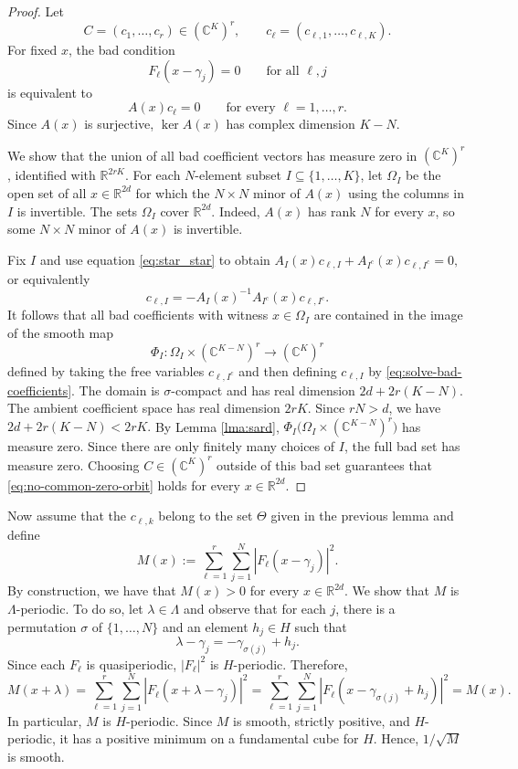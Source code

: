 \documentclass[reqno,a4paper,12pt]{amsart}
\numberwithin{equation}{section}
\newcommand\1{\mathds{1}}
\begin{document}
\begin{proof}
Let
$$
C=(c_1,\dots,c_r)\in(\mathbb C^K)^r,
\qquad
c_\ell=(c_{\ell,1},\dots,c_{\ell,K}).
$$
For fixed $x$, the bad condition
$$
F_\ell(x-\gamma_j)=0
\qquad
\text{for all } \ell,j
$$
is equivalent to
$$
A(x)c_\ell=0
\qquad
\text{for every } \ell=1,\dots,r.
$$
Since $A(x)$ is surjective, $\ker A(x)$ has complex dimension $K-N$.

We show that the union of all bad coefficient vectors has measure zero in
$(\mathbb C^K)^r$, identified with $\mathbb R^{2rK}$. For each
$N$-element subset $I\subseteq\{1,\dots,K\}$, let $\Omega_I$ be the open
set of all $x\in\mathbb R^{2d}$ for which the $N\times N$ minor of
$A(x)$ using the columns in $I$ is invertible. The sets $\Omega_I$ cover
$\mathbb R^{2d}$.
Indeed, $A(x)$ has rank $N$ for every $x$, so some $N\times N$
minor of $A(x)$ is invertible.

Fix $I$ and use equation \eqref{eq:star_star} to obtain
$
A_I(x)c_{\ell,I}+A_{I^c}(x)c_{\ell,I^c}=0,
$
or equivalently
\begin{equation}\label{eq:solve-bad-coefficients}
    c_{\ell,I}
=
-A_I(x)^{-1}A_{I^c}(x)c_{\ell,I^c}.
\end{equation}
It follows that all bad coefficients with witness $x\in\Omega_I$ are contained in the
image of the smooth map
$$
\Phi_I:
\Omega_I\times(\mathbb C^{K-N})^r
\to
(\mathbb C^K)^r
$$
defined by taking the free variables $c_{\ell,I^c}$ and then defining
$c_{\ell,I}$ by \eqref{eq:solve-bad-coefficients}. The domain is
$\sigma$-compact and has real dimension
$
2d+2r(K-N).
$
The ambient coefficient space has real dimension
$
2rK.
$
Since $rN>d$, we have
$
2d+2r(K-N)<2rK.
$
By Lemma \ref{lma:sard}, $\Phi_I\bigl(\Omega_I\times(\mathbb C^{K-N})^r\bigr)$
has measure zero. Since there are only finitely many choices of $I$,  the full
bad set has measure zero.
Choosing $C\in(\mathbb C^K)^r$ outside of this bad set guarantees that
\eqref{eq:no-common-zero-orbit} holds for every $x\in\mathbb R^{2d}$.
\end{proof}

Now assume that the $c_{\ell,k}$ belong to the set $\Theta$ given in the previous lemma and define
\begin{equation}\label{eq:M-definition}
    M(x)
:=
\sum_{\ell=1}^r\sum_{j=1}^N
|F_\ell(x-\gamma_j)|^2.
\end{equation}
By construction, we have that
$
M(x)>0
$
for every $x\in\mathbb R^{2d}$. We show that $M$ is $\Lambda$-periodic. To do so, let $\lambda\in\Lambda$ and observe that for
each $j$, there is a permutation $\sigma$ of $\{1,\dots,N\}$ and an
element $h_j\in H$ such that
$$
\lambda-\gamma_j=-\gamma_{\sigma(j)}+h_j.
$$
Since each $F_\ell$ is quasiperiodic, $|F_\ell|^2$ is $H$-periodic.
Therefore,
$$
M(x+\lambda) = \sum_{\ell=1}^r\sum_{j=1}^N
|F_\ell(x+\lambda-\gamma_j)|^2 = \sum_{\ell=1}^r\sum_{j=1}^N
|F_\ell(x-\gamma_{\sigma(j)}+h_j)|^2 = M(x).
$$
In particular, $M$ is $H$-periodic. Since $M$ is smooth, strictly
positive, and $H$-periodic, it has a positive minimum on a fundamental cube
for $H$. Hence, $1/\sqrt{M}$ is smooth.
\end{document}
